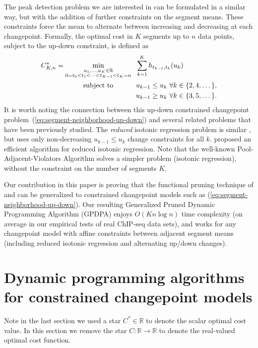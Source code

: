 \documentclass[twoside,11pt]{article}
\newcommand{\RR}{\mathbb R}
\begin{document}
The peak detection problem we are interested in can be formulated in a
similar way, but with the addition of further constraints on the
segment means. These constraints force the mean to alternate between
increasing and decreasing at each changepoint. 
Formally, the optimal cost in $K$ segments up to $n$ data points, subject to the up-down constraint, is defined as
\begin{align}
  \label{eq:segment-neighborhood-up-down}
C^*_{K,n} = \min_{\substack{
u_1,\dots, u_{K}\in\RR
\\
0=t_0<t_1<\cdots<t_{K-1}<t_K=n
}} & \ \
  \sum_{k=1}^K
h_{t_{k-1}, t_k}(u_k)\\
      \text{subject to \hskip 0.8cm} &\ \ u_{k-1} \leq u_k\ \forall k\in\{2,4,\dots\},
  \nonumber\\
  &\ \ u_{k-1} \geq u_k\ \forall k\in\{3,5,\dots\}.
  \nonumber
\end{align}
It is worth noting the connection between this up-down constrained
changepoint problem~(\ref{eq:segment-neighborhood-up-down}) and
several related problems that have been previously studied. The
\emph{reduced} isotonic regression problem is similar
\citep{reduced-monotonic-regression}, but uses only non-decreasing
$u_{k-1}\leq u_k$ change constraints for all $k$. \citet{hardwick2014optimal} proposed an efficient algorithm for 
reduced isotonic regression. Note that the well-known
Pool-Adjacent-Violators Algorithm \citep{mair2009isotone} solves a
simpler problem (isotonic regression), without the constraint on the
number of segments $K$.

Our contribution in this paper is proving
that the functional pruning technique of \citet{pruned-dp} and
\citet{fpop} can be generalized to constrained changepoint models such
as (\ref{eq:segment-neighborhood-up-down}). Our
resulting Generalized Pruned Dynamic Programming Algorithm (GPDPA)
enjoys $O(Kn\log n)$ time complexity (on average in our empirical
tests of real ChIP-seq data sets), and works for any changepoint model
with affine constraints between adjacent segment means (including
reduced isotonic regression and alternating up/down changes).

\section{Dynamic programming algorithms for constrained
  changepoint models}
\label{sec:algorithms}

Note in the last section we used a star $C^*\in\RR$ to denote the
scalar optimal cost value. In this section we remove the star
$C:\RR\rightarrow\RR$ to denote the real-valued optimal cost function.
\end{document}
